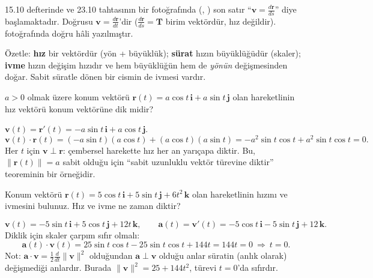 \begin{bilgi}
15.10 defterinde ve 23.10 tahtasının bir fotoğrafında (, ) son satır
``$\mathbf v=\frac{d\mathbf r}{ds}$'' diye başlamaktadır. Doğrusu $\mathbf v=\frac{d\mathbf r}{dt}$'dir ($\frac{d\mathbf r}{ds}=\mathbf T$
birim vektördür, hız değildir).  fotoğrafında doğru hâli yazılmıştır.
\end{bilgi}

Özetle: \textbf{hız} bir vektördür (yön + büyüklük); \textbf{sürat} hızın büyüklüğüdür (skaler); \textbf{ivme} hızın değişim hızıdır
ve hem büyüklüğün hem de \emph{yönün} değişmesinden doğar. Sabit süratle dönen bir cismin de ivmesi vardır.

\begin{soru}
$a>0$ olmak üzere konum vektörü $\mathbf r(t)=a\cos t\,\mathbf i+a\sin t\,\mathbf j$ olan hareketlinin hız vektörü konum vektörüne dik midir?
\end{soru}
\begin{cevap}
$\mathbf v(t)=\mathbf r'(t)=-a\sin t\,\mathbf i+a\cos t\,\mathbf j$.
\[ \mathbf v(t)\cdot\mathbf r(t)=(-a\sin t)(a\cos t)+(a\cos t)(a\sin t)=-a^2\sin t\cos t+a^2\sin t\cos t=0 . \]
Her $t$ için $\mathbf v\perp\mathbf r$: çembersel harekette hız her an yarıçapa diktir. Bu, $\|\mathbf r(t)\|=a$ sabit olduğu için
``sabit uzunluklu vektör türevine diktir'' teoreminin bir örneğidir.
\end{cevap}

\begin{soru}
Konum vektörü $\mathbf r(t)=5\cos t\,\mathbf i+5\sin t\,\mathbf j+6t^2\,\mathbf k$ olan hareketlinin hızını ve ivmesini bulunuz.
Hız ve ivme ne zaman diktir?
\end{soru}
\begin{cevap}
\[ \mathbf v(t)=-5\sin t\,\mathbf i+5\cos t\,\mathbf j+12t\,\mathbf k,\qquad \mathbf a(t)=\mathbf v'(t)=-5\cos t\,\mathbf i-5\sin t\,\mathbf j+12\,\mathbf k . \]
Diklik için skaler çarpım sıfır olmalı:
\[ \mathbf a(t)\cdot\mathbf v(t)=25\sin t\cos t-25\sin t\cos t+144t=144t=0\ \Rightarrow\ \boxed{t=0} . \]
Not: $\mathbf a\cdot\mathbf v=\frac12\frac{d}{dt}\|\mathbf v\|^2$ olduğundan $\mathbf a\perp\mathbf v$ olduğu anlar süratin
(anlık olarak) değişmediği anlardır. Burada $\|\mathbf v\|^2=25+144t^2$, türevi $t=0$'da sıfırdır. \checkmark
\end{cevap}


